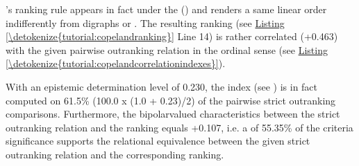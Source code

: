\documentclass[a4paper,12pt,english]{sphinxhowto}
\begin{document}
’s ranking rule appears in fact  under the {\hyperref[\detokenize{tutorial:codual-transform-label}]{}} () and renders a same linear order indifferently from digraphs  or  . The resulting ranking (see \hyperref[\detokenize{tutorial:copelandranking}]{Listing \ref{\detokenize{tutorial:copelandranking}}} Line 14) is rather correlated (+0.463) with the given pairwise outranking relation in the ordinal  sense (see \hyperref[\detokenize{tutorial:copelandcorrelationindexes}]{Listing \ref{\detokenize{tutorial:copelandcorrelationindexes}}}).
\def\sphinxLiteralBlockLabel{\label{\detokenize{tutorial:copelandcorrelationindexes}}}
\begin{sphinxVerbatim}[commandchars=\\\{\},numbers=left,firstnumber=1,stepnumber=1]
  
\end{sphinxVerbatim}

With an epistemic determination level of 0.230, the  index (see ) is in fact computed on 61.5\% (100.0 x (1.0 + 0.23)/2) of the pairwise strict outranking comparisons. Furthermore, the bipolar\sphinxhyphen{}valued  characteristics between the strict outranking relation and the  ranking equals +0.107, i.e. a  of 55.35\% of the criteria significance supports the relational equivalence between the given strict outranking relation and the corresponding  ranking.
\end{document}
